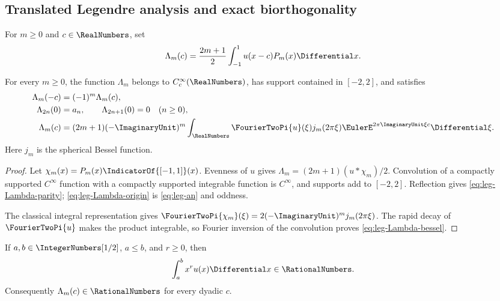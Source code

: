 \subsection{Translated Legendre analysis and exact biorthogonality}

\begin{definition}
\label{def:leg-Lambda}
For $m\ge0$ and $c\in\RealNumbers$, set
\begin{equation}
 \Lambda_m(c)=\frac{2m+1}{2}
 \int_{-1}^{1}u(x-c)P_m(x)\Differential x.
 \label{eq:leg-Lambda}
\end{equation}
\end{definition}

\begin{theorem}
\label{thm:leg-Lambda}
For every $m\ge0$, the function $\Lambda_m$ belongs to $C_c^\infty(\RealNumbers)$,
has support contained
in $[-2,2]$, and satisfies
\begin{align}
 \Lambda_m(-c)&=(-1)^m\Lambda_m(c),
 \label{eq:leg-Lambda-parity}\\
 \Lambda_{2n}(0)&=a_n,\qquad \Lambda_{2n+1}(0)=0\quad(n\ge0),
 \label{eq:leg-Lambda-origin}\\
 \Lambda_m(c)&=(2m+1)(-\ImaginaryUnit)^m
 \int_\RealNumbers\FourierTwoPi{u}(\xi)j_m(2\pi\xi)
 \EulerE^{2\pi\ImaginaryUnit\xi c}\Differential\xi.
 \label{eq:leg-Lambda-bessel}
\end{align}
Here $j_m$ is the spherical Bessel function.
\end{theorem}

\begin{proof}
Let $\chi_m(x)=P_m(x)\IndicatorOf{[-1,1]}(x)$.  Evenness of $u$ gives
$\Lambda_m=(2m+1)(u*\chi_m)/2$.  Convolution of a compactly supported
$C^\infty$ function with a compactly supported integrable function is
$C^\infty$, and supports add to $[-2,2]$.  Reflection gives
\eqref{eq:leg-Lambda-parity}; \eqref{eq:leg-Lambda-origin} is
\eqref{eq:leg-an} and oddness.

The classical integral representation gives
$\FourierTwoPi{\chi_m}(\xi)=2(-\ImaginaryUnit)^mj_m(2\pi\xi)$.  The rapid decay of
$\FourierTwoPi{u}$ makes the product integrable, so Fourier inversion of the
convolution proves \eqref{eq:leg-Lambda-bessel}.
\end{proof}

\begin{lemma}
\label{lem:leg-dyadic-truncated}
If $a,b\in\IntegerNumbers[1/2]$, $a\le b$, and $r\ge0$, then
\begin{equation}
 \int_a^b x^ru(x)\Differential x\in\RationalNumbers.
 \label{eq:leg-dyadic-truncated}
\end{equation}
Consequently $\Lambda_m(c)\in\RationalNumbers$ for every dyadic $c$.
\end{lemma}

